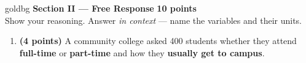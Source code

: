 \documentclass[12pt]{article}
\begin{document}
\vspace{0.14in}

\boxguard[30]
\begin{headlinebox}{goldbg}
\small
\textbf{Section II --- Free Response} \hfill \textbf{10 points}\\
Show your reasoning. Answer \emph{in context} --- name the variables and their units.
\end{headlinebox}

\vspace{0.10in}

\begin{enumerate}[leftmargin=1.9em, itemsep=0.16in, resume]

  \boxguard[26]
  \item \textbf{(4 points)} A community college asked 400 students whether they attend
        \textbf{full-time} or \textbf{part-time} and how they \textbf{usually get to campus}.


\end{enumerate}
\end{document}
